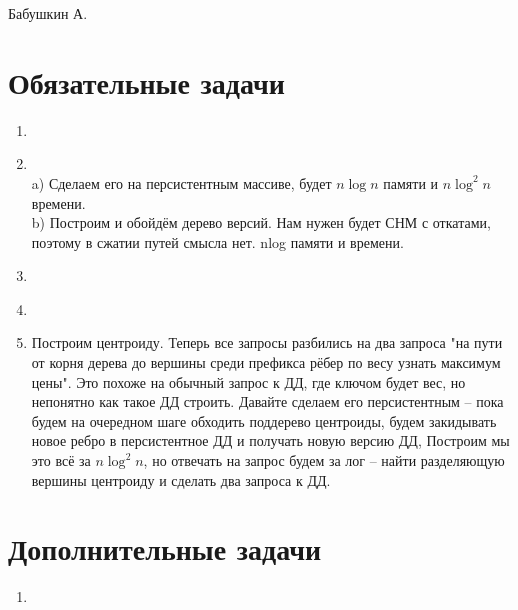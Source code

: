 \documentclass[12pt]{article}
\begin{document}
\def\t{\texttt}

Бабушкин А.

\section{Обязательные задачи}

\begin{enumerate}
    \setlength{\parskip}{0pt} 
    \setlength{\itemsep}{0pt} 
    \item ~\\
    \item ~\\
    a) Сделаем его на персистентным массиве, будет $n\log n$ памяти и $n\log^2 n$ времени. \\
    b) Построим и обойдём дерево версий. Нам нужен будет СНМ с откатами, поэтому в сжатии путей смысла нет. nlog памяти и времени. \\
    \item ~\\
    \item ~\\
    \item Построим центроиду. Теперь все запросы разбились на два запроса "на пути от корня дерева до вершины среди префикса рёбер по весу узнать 
    максимум цены". Это похоже на обычный запрос к ДД, где ключом будет вес, но непонятно как такое ДД строить. Давайте сделаем его персистентным -- 
    пока будем на очередном шаге обходить поддерево центроиды, будем закидывать новое ребро в персистентное ДД и получать новую версию ДД, Построим 
    мы это всё за $n\log^2 n$, но отвечать на запрос будем за лог -- найти разделяющую вершины центроиду и сделать два запроса к ДД.\\
\end{enumerate}

\section{Дополнительные задачи}

\begin{enumerate}
    \setlength{\parskip}{0pt} 
    \setlength{\itemsep}{0pt} 
    \item 
\end{enumerate}
\end{document}
